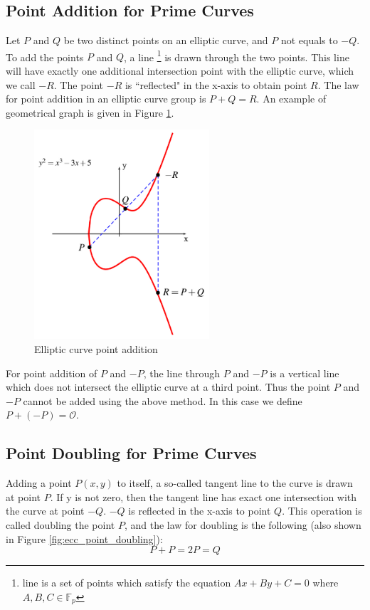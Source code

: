 \subsection*{Point Addition for Prime Curves}
Let $P$ and $Q$ be two distinct points on an elliptic curve, and $P$ not equals to $-Q$. To add the points $P$ and $Q$, a line \footnote{line is a set of points which satisfy the equation $Ax+By+C = 0$ where $A,B,C \in \mathbb{F}_p$} is drawn through the two points. This line will have exactly one additional intersection point with the elliptic curve, which we call $-R$. The point $-R$ is ``reflected" in the x-axis to obtain point $R$. The law for point addition in an elliptic curve group is $P+Q=R$.  An example of geometrical graph is given in Figure \ref{fig:ecc_point_addition}. 
    \begin{figure}[h!]
    	\centering
    	\includegraphics[width=65mm]{./pics/ecc_point_addition.png}
    	\caption{Elliptic curve point addition}
    	\label{fig:ecc_point_addition}
    \end{figure}
    
For point addition of $P$ and $-P$, the line through $P$ and $-P$ is a vertical line which does not intersect the elliptic curve at a third point. Thus the point $P$ and $-P$ cannot be added using the above method. In this case we define $P + (-P) = \mathcal{O}$. 

\subsection*{Point Doubling for Prime Curves}
Adding a point $P(x,y)$ to itself, a so-called tangent line to the curve is drawn at point $P$. If y is not zero, then the tangent line has exact one intersection with the curve at point $-Q$. $-Q$ is reflected in the x-axis to point $Q$. This operation is called doubling the point $P$, and the law for doubling is the following (also shown in Figure \ref{fig:ecc_point_doubling}): 
$$P+P=2P=Q$$ 

